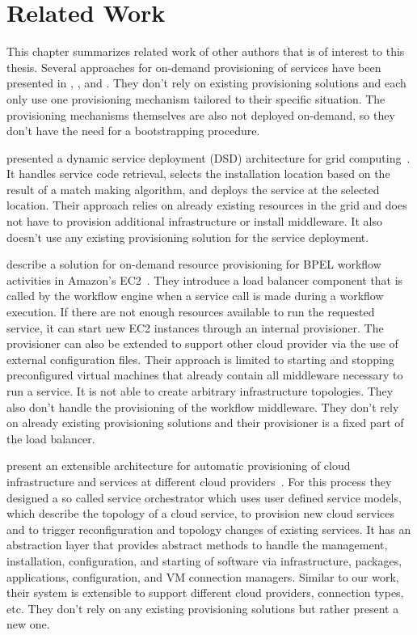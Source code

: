 \chapter{Related Work}
\label{related}

This chapter summarizes related work of other authors that is of interest to this thesis.
Several approaches for on-demand provisioning of services have been presented in \autocite{applyingwebservice}, \autocite{ondemandbpel}, and \autocite{provisioning:architecture}.
They don't rely on existing provisioning solutions and each only use one provisioning mechanism tailored to their specific situation.
The provisioning mechanisms themselves are also not deployed on-demand, so they don't have the need for a bootstrapping procedure.

\citeauthor*{applyingwebservice} presented a dynamic service deployment (DSD) architecture for grid computing~\autocite{applyingwebservice}.
It handles service code retrieval, selects the installation location based on the result of a match making algorithm, and deploys the service at the selected location.
Their approach relies on already existing resources in the grid and does not have to provision additional infrastructure or install middleware.
It also doesn't use any existing provisioning solution for the service deployment.

\citeauthor*{ondemandbpel} describe a solution for on-demand resource provisioning for BPEL workflow activities in Amazon's EC2~\autocite{ondemandbpel}.
They introduce a load balancer component that is called by the workflow engine when a service call is made during a workflow execution.
If there are not enough resources available to run the requested service, it can start new EC2 instances through an internal provisioner.
The provisioner can also be extended to support other cloud provider via the use of external configuration files.
Their approach is limited to starting and stopping preconfigured virtual machines that already contain all middleware necessary to run a service.
It is not able to create arbitrary infrastructure topologies.
They also don't handle the provisioning of the workflow middleware.
They don't rely on already existing provisioning solutions and their provisioner is a fixed part of the load balancer.

\citeauthor*{provisioning:architecture} present an extensible architecture for automatic provisioning of cloud infrastructure and services at different cloud providers~\autocite{provisioning:architecture}.
For this process they designed a so called service orchestrator which uses user defined service models, which describe the topology of a cloud service, to provision new cloud services and to trigger reconfiguration and topology changes of existing services.
It has an abstraction layer that provides abstract methods to handle the management, installation, configuration, and starting of software via infrastructure, packages, applications, configuration, and VM connection managers.
Similar to our work, their system is extensible to support different cloud providers, connection types, etc.
They don't rely on any existing provisioning solutions but rather present a new one.

